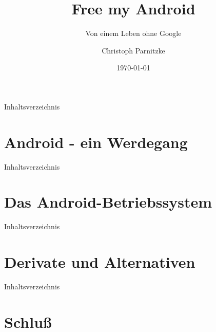 \documentclass[12pt,utf8]{beamer}
\title{Free my Android}
\subtitle{Von einem Leben ohne Google}
\author[C. Parnitzke]{Christoph Parnitzke}
\institute[FOSS AG]{Free and Open Source Software AG\\ Fakultät für Informatik}
\date{\today}
\begin{document}
\begin{frame}
	\titlepage
\end{frame}

\begin{frame}{Inhaltsverzeichnis}
	\tableofcontents
\end{frame}

\section{Android - ein Werdegang}

\begin{frame}{Inhaltsverzeichnis}
\end{frame}




\section{Das Android-Betriebssystem}

\begin{frame}{Inhaltsverzeichnis}
\end{frame}




\section{Derivate und Alternativen}

\begin{frame}{Inhaltsverzeichnis}
\end{frame}

%


\section{Schluß}

%

\end{document}
